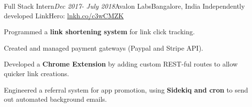\begin{rSubsection}{Full Stack Intern}{\em Dec 2017- July 2018}{Avalon Labs}{Bangalore, India}
    Independently developed LinkHero: \href{http://lnkh.co/c3wCMZK}{lnkh.co/c3wCMZK}
    \item
    Programmed a \textbf{link shortening system} for link click tracking.
    \item 
    Created and managed payment gateways (Paypal and Stripe API).
    \item
    Developed a \textbf{Chrome Extension} by adding custom REST-ful routes to allow quicker link creations.
    \item Engineered a referral system for app promotion, using \textbf{Sidekiq and cron} to send out automated background emails.
\end{rSubsection}